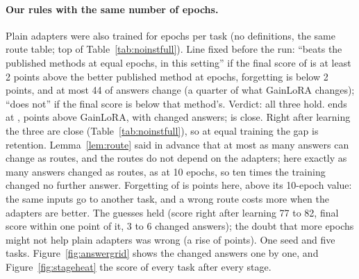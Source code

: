 \paragraph{Our rules with the same number of epochs.} Plain adapters were also trained for \AudFullEpochs{} epochs per task (no definitions, the same route table; top of Table~\ref{tab:noinstfull}).
Line fixed before the run: ``beats the published methods at equal epochs, in this setting'' if the final score of \recog{} is at least 2 points above the better published method at \AudFullEpochs{} epochs, forgetting is below 2 points, and at most 44 of \AudFullCompared{} answers change (a quarter of what GainLoRA changes); ``does not'' if the final score is below that method's. Verdict: all three hold. \recog{} ends at \AudFullOursRidgeAP{}, \AudFullOursRidgeAboveGainlora{} points above GainLoRA, with \AudFullOursRidgeChanged{} changed answers; \handicap{} is close. Right after learning the three are close (Table~\ref{tab:noinstfull}), so at equal training the gap is retention.
Lemma~\ref{lem:route} said in advance that at most as many answers can change as routes, and the routes do not depend on the adapters; here exactly as many answers changed as routes, as at 10 epochs, so ten times the training changed no further answer. Forgetting of \recog{} is \AudFullOursRidgeFT{} points here, above its 10-epoch value: the same inputs go to another task, and a wrong route costs more when the adapters are better.
The guesses held (score right after learning 77 to 82, final score within one point of it, 3 to 6 changed answers); the doubt that more epochs might not help plain adapters was wrong (a rise of \AudFullOursLearnedGain{} points). One seed and five tasks. Figure~\ref{fig:answergrid} shows the changed answers one by one, and Figure~\ref{fig:stageheat} the score of every task after every stage.




